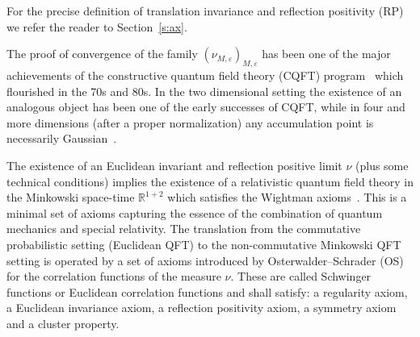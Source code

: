 \documentclass[a4paper,11pt]{article}
\newcommand{\assign}{:=}
\newcommand{\mathd}{\mathrm{d}}
\newcommand{\tmop}[1]{\ensuremath{\operatorname{#1}}}
\numberwithin{equation}{section}
\begin{document}
For the precise definition of translation invariance and reflection positivity (RP) we refer the reader to Section~\ref{s:ax}. 


\medskip

%



The proof of convergence of the family $(\nu_{M, \varepsilon})_{M,  \varepsilon}$ 
has been one of the major achievements of the constructive quantum field theory (CQFT)
program~{\cite{velo_constructive_1973,simon_po2_1974,MR887102,rivasseau_perturbative_1991,baez_introduction_1992,jaffe_constructive_2000,MR2391806,summers_perspective_2012}}
which flourished in the 70s and 80s. 
%
In the two dimensional setting the existence of an
analogous object has been one of the early successes of CQFT, while in four and more dimensions (after a proper normalization) any accumulation point is necessarily Gaussian~{\cite{fernandez_random_1992}}.


The existence of an Euclidean invariant and reflection positive limit $\nu$ (plus some technical conditions) 
implies the existence of a
relativistic quantum field theory in the Minkowski space-time $\mathbb{R}^{1
+ 2}$ which satisfies the Wightman axioms~{\cite{MR0436800}}. This is a minimal set of
axioms capturing the essence of the combination of quantum mechanics and
special relativity. The translation from the commutative probabilistic setting
(Euclidean QFT) to the non-commutative Minkowski QFT setting is operated by a
set of axioms introduced by
Osterwalder--Schrader (OS)~{\cite{osterwalder_axioms_1973,osterwalder_axioms_1975}}
for the correlation functions of the measure $\nu$. These  are called Schwinger
functions or Euclidean correlation functions and shall satisfy: a
regularity axiom, a Euclidean invariance axiom, a reflection
positivity axiom, a symmetry axiom and a cluster property. \
\end{document}
